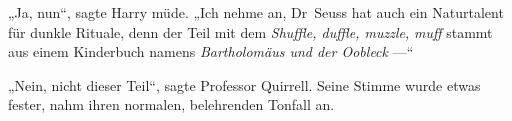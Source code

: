 „Ja, nun“, sagte Harry müde.
„Ich nehme an, Dr~Seuss hat auch ein Naturtalent für dunkle Rituale, denn der Teil mit dem \emph{Shuffle, duffle, muzzle,} \emph{muff} stammt aus einem Kinderbuch namens \emph{Bartholomäus und der Oobleck} —“

„Nein, nicht dieser Teil“, sagte Professor Quirrell. Seine Stimme wurde etwas fester, nahm ihren normalen, belehrenden Tonfall an.
